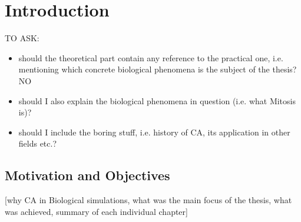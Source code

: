 \documentclass[../projekt.tex]{subfiles}
\begin{document}

\chapter{Introduction}
\label{chap-intro}

\noindent TO ASK: 
\begin{itemize}
	\item should the theoretical part contain any reference to the practical one, i.e. mentioning which concrete biological phenomena is the subject of the thesis?  NO
	\item should I also explain the biological phenomena in question (i.e. what Mitosis is)?  
	\item should I include the boring stuff, i.e. history of CA, its application in other fields etc.?
\end{itemize}

\section{Motivation and Objectives}
[why CA in Biological simulations, what was the main focus of the thesis, what was achieved, summary of each individual chapter]

\end{document}

